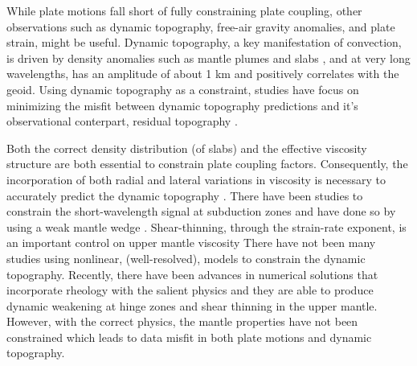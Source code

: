 \documentclass[12pt]{article}
\begin{document}
While plate motions fall short of fully constraining plate coupling, other observations such as dynamic topography, free-air gravity anomalies, and plate strain, might be useful.  Dynamic topography, a key manifestation of convection,
is driven by density anomalies such as mantle plumes and slabs \citep{hager1985lower}, and at very long wavelengths, has an amplitude of about 1 km and positively correlates with the geoid. Using dynamic topography as a constraint, studies have focus on minimizing the misfit between dynamic topography predictions and it's observational conterpart, residual topography \citep{yang2016dynamic}. 

Both the correct density distribution (of slabs) and the effective viscosity structure are both essential to constrain plate coupling factors. Consequently, the incorporation of both radial and lateral variations in viscosity is necessary  to accurately predict the dynamic topography \citep{moresi1996constraints,kaufmann2000mantle}. 
There have been studies to constrain the short-wavelength signal at subduction zones and have done so by using a weak mantle wedge \citep{billen2001low}. 
Shear-thinning, through the strain-rate exponent, is an important control on upper mantle viscosity \citep{karato1993rheology}
There have not been many studies using nonlinear, (well-resolved), models to constrain the dynamic topography. Recently, there have been advances in numerical solutions that incorporate rheology with the salient physics and they are able to produce dynamic weakening at hinge zones and shear thinning in the upper mantle. However, with the correct physics, the mantle properties have not been constrained \citep{Stadler27082010,JGRB17312} which leads to data misfit in both plate motions and dynamic topography.
\end{document}
